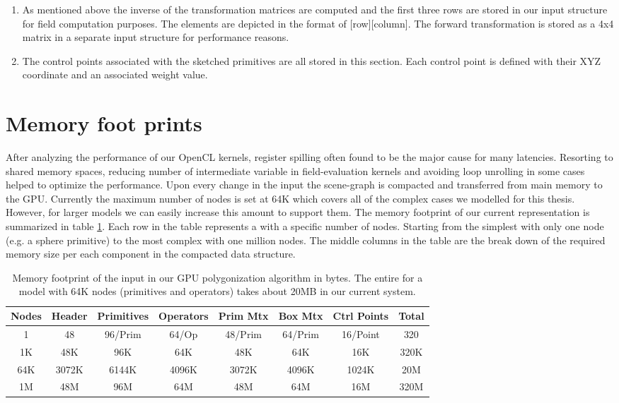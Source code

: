 \begin{enumerate}
 
 \item As mentioned above the inverse of the transformation matrices are computed and the first three rows are stored in our input 
 structure for field computation purposes. The elements are depicted in the format of [row][column]. The forward transformation is 
 stored as a 4x4 matrix in a separate input structure for performance reasons. 
 
 \item The control points associated with the sketched primitives are all stored in this section. Each control point is defined with 
 their XYZ coordinate and an associated weight value. 
\end{enumerate}

\section{Memory foot prints}\label{sec:memory}
After analyzing the performance of our OpenCL kernels, register spilling often found to be the major cause for many latencies. Resorting to shared memory spaces, reducing 
number of intermediate variable in field-evaluation kernels and avoiding loop unrolling in some cases helped to optimize the performance. Upon every
change in the input \blob the scene-graph is compacted and transferred from main memory to the GPU. Currently the maximum number of nodes is set at 64K which covers
all of the complex cases we modelled for this thesis. However, for larger \blob models  we can easily increase this amount to support them. The memory footprint of 
our current \blob representation is summarized in table \ref{table:memfootprint}. Each row in the table represents a \blob with a specific number of nodes.
Starting from the simplest \blob with only one node (e.g. a sphere primitive) to the most complex \blob with one million nodes. The middle columns in the 
table are the break down of the required memory size per each component in the compacted \blob data structure.

\begin{table}[H]
\begin{center}
	 \caption{\label{table:memfootprint}
  {Memory footprint of the input \blob in our GPU polygonization algorithm in bytes. The entire \blob for a model with 64K nodes (primitives and operators) 
  takes about 20MB in our current system.}
}
  \begin{tabular}{ | c | c | c | c | c | c | c | c |}
    \hline    
    Nodes & Header & Primitives & Operators & Prim Mtx & Box Mtx & Ctrl Points & Total \\ \hline \hline
    1 & 48 & 96/Prim & 64/Op & 48/Prim & 64/Prim & 16/Point & 320 \\ \hline
    1K & 48K & 96K & 64K & 48K & 64K & 16K & 320K \\ \hline
    64K & 3072K & 6144K & 4096K & 3072K & 4096K & 1024K & 20M \\ \hline
    1M & 48M & 96M & 64M & 48M & 64M & 16M & 320M \\ 
    \hline
  	\end{tabular}
\end{center}
\end{table}


